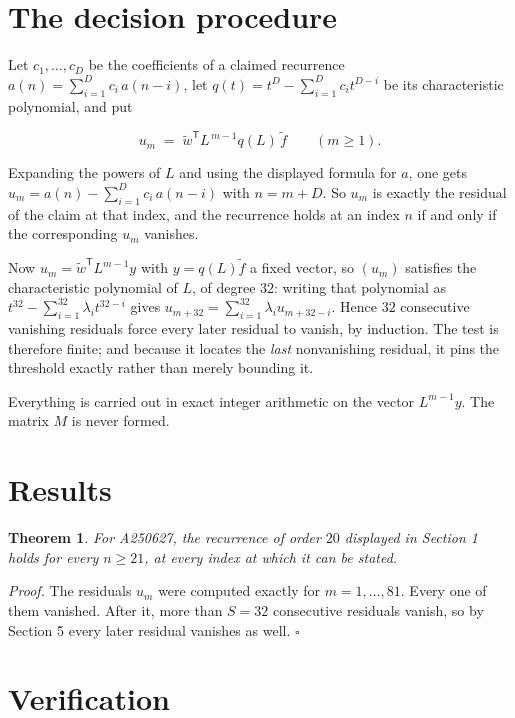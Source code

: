\documentclass[11pt]{article}
\newtheorem{theorem}{Theorem}
\theoremstyle{definition}
\begin{document}
\section{The decision procedure}

Let $c_1,\dots,c_D$ be the coefficients of a claimed recurrence $a(n) = \sum_{i=1}^{D} c_i\,a(n-i)$, let $q(t) = t^{D} - \sum_{i=1}^{D} c_i t^{D-i}$ be its characteristic polynomial, and put

\[u_m \;=\; \tilde w^{\mathsf T} L^{\,m-1} q(L)\,\tilde f \qquad (m \ge 1).\]

Expanding the powers of $L$ and using the displayed formula for $a$, one gets $u_m = a(n) - \sum_{i=1}^{D} c_i\,a(n-i)$ with $n = m + D$. So $u_m$ is exactly the residual of the claim at that index, and the recurrence holds at an index $n$ if and only if the corresponding $u_m$ vanishes.

Now $u_m = \tilde w^{\mathsf T} L^{m-1} y$ with $y = q(L)\tilde f$ a fixed vector, so $(u_m)$ satisfies the characteristic polynomial of $L$, of degree $32$: writing that polynomial as $t^{32} - \sum_{i=1}^{32} \lambda_i t^{32-i}$ gives $u_{m+32} = \sum_{i=1}^{32} \lambda_i u_{m+32-i}$. Hence $32$ consecutive vanishing residuals force every later residual to vanish, by induction. The test is therefore finite; and because it locates the {\itshape last} nonvanishing residual, it pins the threshold exactly rather than merely bounding it.

Everything is carried out in exact integer arithmetic on the vector $L^{m-1}y$. The matrix $M$ is never formed.

\section{Results}

\begin{theorem} For A250627, the recurrence of order $20$ displayed in Section 1 holds for every $n \ge 21$, at every index at which it can be stated.\end{theorem}

{\itshape Proof.} The residuals $u_m$ were computed exactly for $m = 1,\dots,81$. Every one of them vanished. After it, more than $S = 32$ consecutive residuals vanish, so by Section 5 every later residual vanishes as well. $\square$

\section{Verification}
\end{document}
